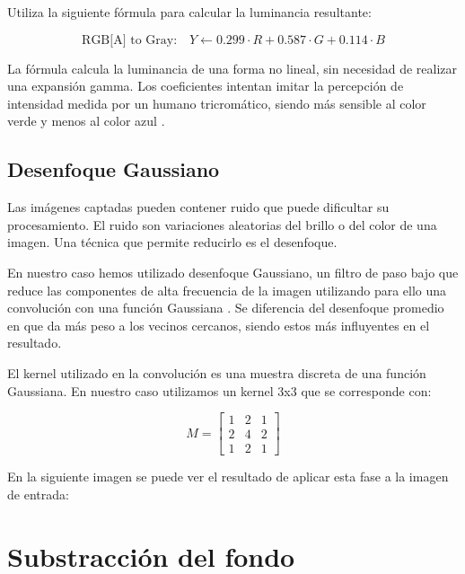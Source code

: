 Utiliza la siguiente fórmula para calcular la luminancia resultante:

\begin{equation*}
    \text{RGB[A] to Gray:} \quad Y \leftarrow 0.299 \cdot R + 0.587 \cdot G + 0.114 \cdot B
\end{equation*}

La fórmula calcula la luminancia de una forma no lineal, sin necesidad
de realizar una expansión gamma. Los coeficientes intentan imitar la
percepción de intensidad medida por un humano tricromático, siendo más
sensible al color verde y menos al color azul \citep{wiki:grayscale}.

\subsection{Desenfoque Gaussiano}\label{desenfoque-gaussiano}

Las imágenes captadas pueden contener ruido que puede dificultar su
procesamiento. El ruido son variaciones aleatorias del brillo o del
color de una imagen. Una técnica que permite reducirlo es el desenfoque.

En nuestro caso hemos utilizado desenfoque Gaussiano, un filtro de paso
bajo que reduce las componentes de alta frecuencia de la imagen
utilizando para ello una convolución con una función Gaussiana
\citep{wiki:gaussian}. Se diferencia del desenfoque promedio en que da
más peso a los vecinos cercanos, siendo estos más influyentes en el
resultado.

El kernel utilizado en la convolución es una muestra discreta de una
función Gaussiana. En nuestro caso utilizamos un kernel 3x3 que se
corresponde con: \citep{book:mastering_opencv}

\begin{equation*}
    M = 
    \begin{bmatrix}
    1 & 2 & 1 \\[0.3em] 
    2 & 4 & 2 \\[0.3em] 
    1 & 2 & 1
    \end{bmatrix}
\end{equation*}

En la siguiente imagen se puede ver el resultado de aplicar esta fase a
la imagen de entrada:


\section{Substracción del fondo}\label{substraccion-del-fondo}

